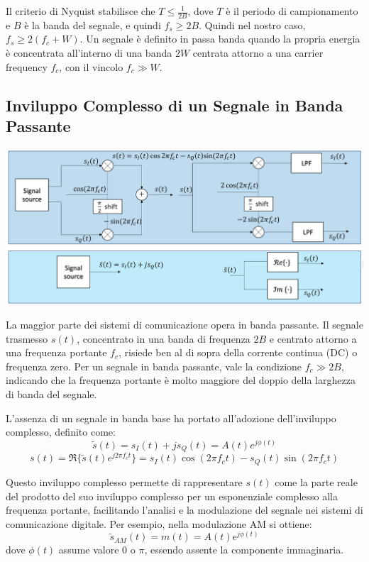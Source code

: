 Il criterio di Nyquist stabilisce che \( T \leq \frac{1}{2B} \), dove \( T \) è il periodo di campionamento e \( B \) è la banda del segnale, e quindi \( f_s \geq 2B \). Quindi nel nostro caso, $f_s \geq 2(f_c + W)$.
Un segnale è definito in passa banda quando la propria energia è concentrata all'interno di una banda $2W$ centrata attorno a una carrier frequency $f_c$, con il vincolo $f_c \gg W$.

\subsection*{Inviluppo Complesso di un Segnale in Banda Passante}
\begin{center}
    \includegraphics[width=1\textwidth]{imgs/complex_envelope.png}
\end{center}
La maggior parte dei sistemi di comunicazione opera in banda passante. Il segnale trasmesso \( s(t) \), concentrato in una banda di frequenza \( 2B \) e centrato attorno a una frequenza portante \( f_c \), risiede ben al di sopra della corrente continua (DC) o frequenza zero. Per un segnale in banda passante, vale la condizione \( f_c \gg 2B \), indicando che la frequenza portante è molto maggiore del doppio della larghezza di banda del segnale.

L'assenza di un segnale in banda base ha portato all'adozione dell'inviluppo complesso, definito come:
\begin{equation}
    \tilde{s}(t) = s_I(t) + js_Q(t) = A(t)e^{j\phi(t)}
\end{equation}
\begin{equation}
    s(t) = \Re\{\tilde{s}(t)e^{j2\pi f_c t}\} = s_I(t)\cos(2\pi f_c t) - s_Q(t)\sin(2\pi f_c t)
\end{equation}

Questo inviluppo complesso permette di rappresentare \( s(t) \) come la parte reale del prodotto del suo inviluppo complesso per un esponenziale complesso alla frequenza portante, facilitando l'analisi e la modulazione del segnale nei sistemi di comunicazione digitale. Per esempio, nella modulazione AM si ottiene:
\begin{equation}
    \tilde{s}_{AM}(t) = m(t) = A(t)e^{j\phi(t)}
\end{equation}
dove \( \phi(t) \) assume valore \( 0 \) o \( \pi \), essendo assente la componente immaginaria.

